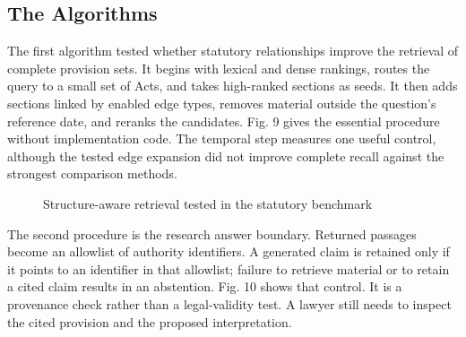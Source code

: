 \documentclass[12pt,a4paper]{article}
\begin{document}
\subsection{The Algorithms}

The first algorithm tested whether statutory relationships improve the retrieval of complete provision sets. It begins with lexical and dense rankings, routes the query to a small set of Acts, and takes high-ranked sections as seeds. It then adds sections linked by enabled edge types, removes material outside the question's reference date, and reranks the candidates. Fig. 9 gives the essential procedure without implementation code. The temporal step measures one useful control, although the tested edge expansion did not improve complete recall against the strongest comparison methods.


\begin{figure}[H]
\centering
{}
\caption{Structure-aware retrieval tested in the statutory benchmark}
\end{figure}

The second procedure is the research answer boundary. Returned passages become an allowlist of authority identifiers. A generated claim is retained only if it points to an identifier in that allowlist; failure to retrieve material or to retain a cited claim results in an abstention. Fig. 10 shows that control. It is a provenance check rather than a legal-validity test. A lawyer still needs to inspect the cited provision and the proposed interpretation.
\end{document}
